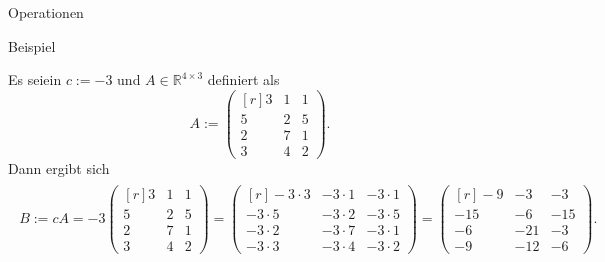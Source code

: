 \documentclass[
  8pt,
  ignorenonframetext,
]{beamer}
\begin{document}
\begin{frame}{Operationen}
\protect\hypertarget{operationen-7}{}
\small

Beispiel

\footnotesize

Es seiein \(c:=-3\) und \(A\in \mathbb{R}^{4\times 3}\) definiert als
\begin{equation}
A := \begin{pmatrix*}[r]
3 & 1 & 1\\
5 & 2 & 5\\
2 & 7 & 1\\
3 & 4 & 2
\end{pmatrix*}.
\end{equation} Dann ergibt sich \begin{align}
\begin{split}
B :=
cA
= -3\begin{pmatrix*}[r]
3 & 1 & 1\\
5 & 2 & 5\\
2 & 7 & 1\\
3 & 4 & 2
\end{pmatrix*}
= \begin{pmatrix*}[r]
-3\cdot3 & -3\cdot1 & -3\cdot1\\
-3\cdot5 & -3\cdot2 & -3\cdot5\\
-3\cdot2 & -3\cdot7 & -3\cdot1\\
-3\cdot3 & -3\cdot4 & -3\cdot2
\end{pmatrix*}
= \begin{pmatrix*}[r]
-9  &  -3 & -3  \\
-15 &  -6 & -15 \\
-6  & -21 & -3  \\
-9  & -12 & -6
\end{pmatrix*}.
\end{split}
\end{align}
\end{frame}
\end{document}
